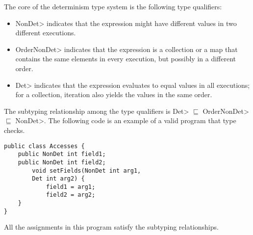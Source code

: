 The core of the determinism type system
is the following type qualifiers:
\begin{itemize}
    \item \<NonDet> indicates
    that the expression might have different values in two different executions.
    \item \<OrderNonDet> indicates that the expression is a collection or
    a map that contains the same elements in every execution, but possibly
    in a different order.
    \item \<Det> indicates that the expression evaluates to equal values in
    all executions; for a collection, iteration
    also yields the values in the same order.
\end{itemize}
The subtyping relationship among the type qualifiers is \<Det> $\sqsubseteq$ \<OrderNonDet> $\sqsubseteq$ \<NonDet>.
The following code is an example of a valid program that type checks. 
\begin{Verbatim}
public class Accesses {
    public NonDet int field1;
    public NonDet int field2;
        void setFields(NonDet int arg1, 
        Det int arg2) {
            field1 = arg1;
            field2 = arg2;
    }
}
\end{Verbatim}
All the assignments in this program 
satisfy the subtyping relationships.
 
